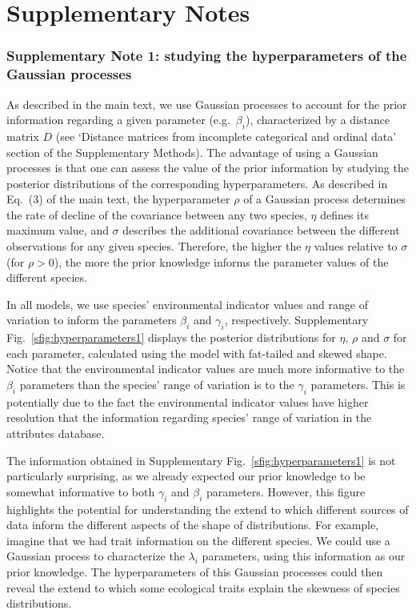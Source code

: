 \documentclass[11pt, a4paper]{article}
\begin{document}
\section*{Supplementary Notes}
\subsubsection*{Supplementary Note 1: studying the hyperparameters of the Gaussian processes}
As described in the main text, we use Gaussian processes to account for the prior information regarding a given parameter (e.g.~$\beta_i$), characterized by a distance matrix $D$ (see `Distance matrices from incomplete categorical and ordinal data' section of the Supplementary Methods). The advantage of using a Gaussian processes is that one can assess the value of the prior information by studying the posterior distributions of the corresponding hyperparameters. As described in Eq.~(3) of the main text, the hyperparameter $\rho$ of a Gaussian process determines the rate of decline of the covariance between any two species, $\eta$ defines its maximum value, and $\sigma$ describes the additional covariance between the different observations for any given species. Therefore, the higher the $\eta$ values relative to $\sigma$ (for $\rho>0$), the more the prior knowledge informs the parameter values of the different species. 

In all models, we use species' environmental indicator values and range of variation to inform the parameters $\beta_i$ and $\gamma_i$, respectively. Supplementary Fig.~\ref{sfig:hyperparameters1} displays the posterior distributions for $\eta$, $\rho$ and $\sigma$ for each parameter, calculated using the model with fat-tailed and skewed shape. Notice that the environmental indicator values are much more informative to the $\beta_{i}$ parameters than the species' range of variation is to the $\gamma_{i}$ parameters. This is potentially due to the fact the environmental indicator values have higher resolution that the information regarding species' range of variation in the attributes database. 

The information obtained in Supplementary Fig.~\ref{sfig:hyperparameters1} is not particularly surprising, as we already expected our prior knowledge to be somewhat informative to both $\gamma_{i}$ and $\beta_{i}$ parameters. However, this figure highlights the potential for understanding the extend to which different sources of data inform the different aspects of the shape of distributions. For example, imagine that we had trait information on the different species. We could use a Gaussian process to characterize the $\lambda_i$ parameters, using this information as our prior knowledge. The hyperparameters of this Gaussian processes could then reveal the extend to which some ecological traits explain the skewness of species distributions.
\end{document}
